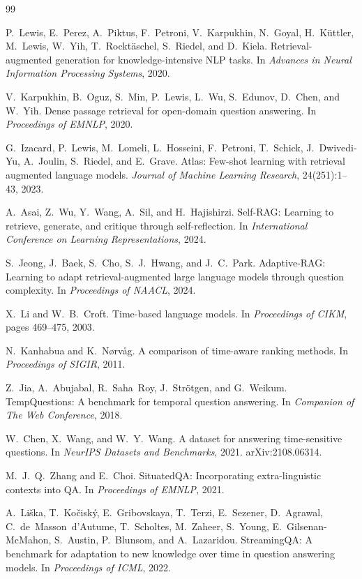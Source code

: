\documentclass[11pt]{article}
\begin{document}
\begin{thebibliography}{99}

P.~Lewis, E.~Perez, A.~Piktus, F.~Petroni, V.~Karpukhin, N.~Goyal, H.~K\"uttler, M.~Lewis, W.~Yih, T.~Rockt\"aschel, S.~Riedel, and D.~Kiela.
Retrieval-augmented generation for knowledge-intensive NLP tasks.
In \emph{Advances in Neural Information Processing Systems}, 2020.

V.~Karpukhin, B.~Oguz, S.~Min, P.~Lewis, L.~Wu, S.~Edunov, D.~Chen, and W.~Yih.
Dense passage retrieval for open-domain question answering.
In \emph{Proceedings of EMNLP}, 2020.

G.~Izacard, P.~Lewis, M.~Lomeli, L.~Hosseini, F.~Petroni, T.~Schick, J.~Dwivedi-Yu, A.~Joulin, S.~Riedel, and E.~Grave.
Atlas: Few-shot learning with retrieval augmented language models.
\emph{Journal of Machine Learning Research}, 24(251):1--43, 2023.

A.~Asai, Z.~Wu, Y.~Wang, A.~Sil, and H.~Hajishirzi.
Self-RAG: Learning to retrieve, generate, and critique through self-reflection.
In \emph{International Conference on Learning Representations}, 2024.

S.~Jeong, J.~Baek, S.~Cho, S.~J.~Hwang, and J.~C.~Park.
Adaptive-RAG: Learning to adapt retrieval-augmented large language models through question complexity.
In \emph{Proceedings of NAACL}, 2024.

X.~Li and W.~B.~Croft.
Time-based language models.
In \emph{Proceedings of CIKM}, pages 469--475, 2003.

N.~Kanhabua and K.~N{\o}rv{\aa}g.
A comparison of time-aware ranking methods.
In \emph{Proceedings of SIGIR}, 2011.

Z.~Jia, A.~Abujabal, R.~Saha~Roy, J.~Str\"otgen, and G.~Weikum.
TempQuestions: A benchmark for temporal question answering.
In \emph{Companion of The Web Conference}, 2018.

W.~Chen, X.~Wang, and W.~Y.~Wang.
A dataset for answering time-sensitive questions.
In \emph{NeurIPS Datasets and Benchmarks}, 2021.
arXiv:2108.06314.

M.~J.~Q.~Zhang and E.~Choi.
SituatedQA: Incorporating extra-linguistic contexts into QA.
In \emph{Proceedings of EMNLP}, 2021.

A.~Li\v{s}ka, T.~Ko\v{c}isk\'y, E.~Gribovskaya, T.~Terzi, E.~Sezener, D.~Agrawal, C.~de~Masson~d'Autume, T.~Scholtes, M.~Zaheer, S.~Young, E.~Gilsenan-McMahon, S.~Austin, P.~Blunsom, and A.~Lazaridou.
StreamingQA: A benchmark for adaptation to new knowledge over time in question answering models.
In \emph{Proceedings of ICML}, 2022.


\end{thebibliography}
\end{document}
